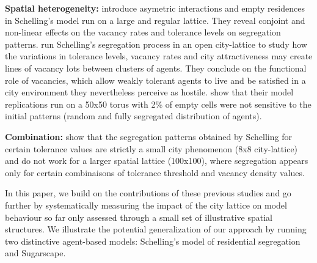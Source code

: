 \documentclass[Afour,sageh,times]{sagej}
\begin{document}
\textbf{Spatial heterogeneity:} \citet{StaufferSolomon2007} introduce asymetric interactions and empty residences in Schelling's model run on a large and regular lattice. They reveal conjoint and non-linear effects on the vacancy rates and tolerance levels on segregation patterns. \citet{Gauvinetal2010} run Schelling's segregation process in an open city-lattice to study how the variations in tolerance levels, vacancy rates and city attractiveness may create lines of vacancy lots between clusters of agents. They conclude on the functional role of vacancies, which allow weakly tolerant agents to live and be satisfied in a city environment they nevertheless perceive as hostile. \citet{HatnaBenenson2012} show that their model replications run on a 50x50 torus with 2\% of empty cells were not sensitive to the initial patterns (random and fully segregated distribution of agents).

\textbf{Combination:} \citet{Singhetal2009} show that the segregation patterns obtained by Schelling for certain tolerance values are strictly a small city phenomenon (8x8 city-lattice) and do not work for a larger spatial lattice (100x100), where segregation appears only for certain combinaisons of tolerance threshold and vacancy density values. 

In this paper, we build on the contributions of these previous studies and go further by systematically measuring the impact of the city lattice on model behaviour so far only assessed through a small set of illustrative spatial structures. We illustrate the potential generalization of our approach by running two distinctive agent-based models: Schelling's model of residential segregation and Sugarscape.
\end{document}
